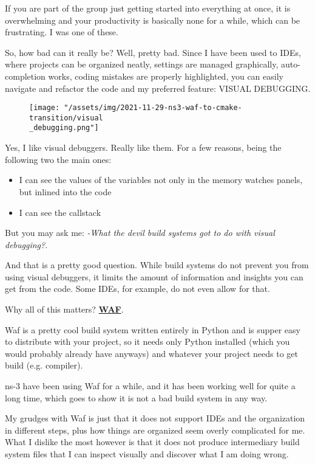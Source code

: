 \documentclass{article}
\begin{document}
    If you are part of the group just getting started into everything at once, it is overwhelming and your productivity
    is basically none for a while, which can be frustrating. I was one of these.

    So, how bad can it really be? Well, pretty bad. Since I have been used to IDEs, where projects can be organized
    neatly, settings are managed graphically, auto-completion works, coding mistakes are properly highlighted, you can
    easily navigate and refactor the code and my preferred feature: VISUAL DEBUGGING.

    \begin{figure}
        \texttt{[image: "/assets/img/2021-11-29-ns3-waf-to-cmake-transition/visual\\\_debugging.png"]}
    \end{figure}

    Yes, I like visual debuggers. Really like them. For a few reasons, being the following two the main ones:

    \begin{itemize}
        \item I can see the values of the variables not only in the memory watches panels, but inlined into the code
        \item I can see the callstack
    \end{itemize}

    But you may ask me: \textit{-What the devil build systems got to do with visual debugging?}.

    And that is a pretty good question. While build systems do not prevent you from using visual debuggers, it limits
    the amount of information and insights you can get from the code.
    Some IDEs, for example, do not even allow for that.

    Why all of this matters? \href{https://waf.io/}{\textbf{WAF}}.

    Waf is a pretty cool build system written entirely in Python and is supper easy to distribute with your project,
    so it needs only Python installed (which you would probably already have anyways) and whatever your project needs
    to get build (e.g. compiler).

    ns-3 have been using Waf for a while, and it has been working well for quite a long time, which goes to show it is
    not a bad build system in any way.

    My grudges with Waf is just that it does not support IDEs and the organization in different steps, plus how
    things are organized seem overly complicated for me. What I dislike the most however is that it does not produce
    intermediary build system files that I can inspect visually and discover what I am doing wrong.
\end{document}

